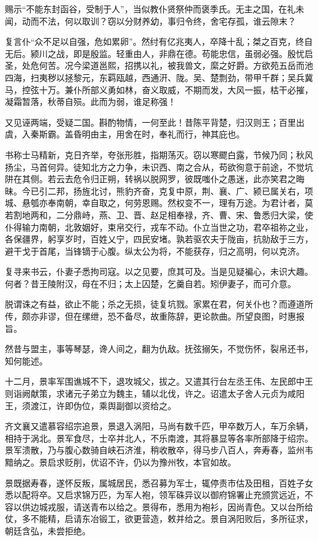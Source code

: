 \documentclass[12pt,UTF8]{ctexbook}
\begin{document}
赐示“不能东封函谷，受制于人”，当似教仆贤祭仲而褒季氏。无主之国，在礼未闻，动而不法，何以取训？窃以分财养幼，事归令终，舍宅存孤，谁云隙末？

复言仆“众不足以自强，危如累卵”。然纣有亿兆夷人，卒降十乱；桀之百克，终自无后。颍川之战，即是殷监。轻重由人，非鼎在德。苟能忠信，虽弱必强。殷忧启圣，处危何苦。况今梁道邕熙，招携以礼，被我兽文，縻之好爵。方欲苑五岳而池四海，扫夷秽以拯黎元，东羁瓯越，西通汧、陇。吴、楚剽劲，带甲千群；吴兵冀马，控弦十万。兼仆所部义勇如林，奋义取威，不期而发，大风一振，枯干必摧，凝霜暂落，秋蒂自殒。此而为弱，谁足称强！

又见诬两端，受疑二国。斟酌物情，一何至此！昔陈平背楚，归汉则王；百里出虞，入秦斯霸。盖昏明由主，用舍在时，奉礼而行，神其庇也。

书称士马精新，克日齐举，夸张形胜，指期荡灭。窃以寒飂白露，节候乃同；秋风扬尘，马首何异。徒知北方之力争，未识西、南之合从，苟欲徇意于前途，不觉坑阱在其侧。若云去危令归正朔，转祸以脱网罗，彼既嗤仆之愚迷，此亦笑君之晦昧。今已引二邦，扬旌北讨，熊豹齐奋，克复中原，荆、襄、广、颍已属关右，项城、悬瓠亦奉南朝，幸自取之，何劳恩赐。然权变不一，理有万途。为君计者，莫若割地两和，二分鼎峙，燕、卫、晋、赵足相奉禄，齐、曹、宋、鲁悉归大梁，使仆得输力南朝，北敦姻好，束帛交行，戎车不动。仆立当世之功，君卒祖祢之业，各保疆界，躬享岁时，百姓乂宁，四民安堵。孰若驱农夫于陇亩，抗勍敌于三方，避干戈于首尾，当锋镝于心腹。纵太公为将，不能获存，归之高明，何以克济。

复寻来书云，仆妻子悉拘司寇。以之见要，庶其可及。当是见疑褊心，未识大趣。何者？昔王陵附汉，母在不归；太上囚楚，乞羹自若。矧伊妻子，而可介意。

脱谓诛之有益，欲止不能；杀之无损，徒复坑戮。家累在君，何关仆也？而遵道所传，颇亦非谬，但在缧绁，恐不备尽，故重陈辞，更论款曲。所望良图，时惠报旨。

然昔与盟主，事等琴瑟，谗人间之，翻为仇敌。抚弦搦矢，不觉伤怀，裂帛还书，知何能述。

十二月，景率军围谯城不下，退攻城父，拔之。又遣其行台左丞王伟、左民郎中王则诣阙献策，求诸元子弟立为魏主，辅以北伐，许之。诏遣太子舍人元贞为咸阳王，须渡江，许即伪位，乘舆副御以资给之。

齐文襄又遣慕容绍宗追景，景退入涡阳，马尚有数千匹，甲卒数万人，车万余辆，相持于涡北。景军食尽，士卒并北人，不乐南渡，其将暴显等各率所部降于绍宗。景军溃散，乃与腹心数骑自峡石济淮，稍收散卒，得马步八百人，奔寿春，监州韦黯纳之。景启求贬削，优诏不许，仍以为豫州牧，本官如故。

景既据寿春，遂怀反叛，属城居民，悉召募为军士，辄停责市估及田租，百姓子女悉以配将卒。又启求锦万匹，为军人袍，领军硃异议以御府锦署止充颁赏远近，不容以供边城戎服，请送青布以给之。景得布，悉用为袍衫，因尚青色。又以台所给仗，多不能精，启请东冶锻工，欲更营造，敕并给之。景自涡阳败后，多所征求，朝廷含弘，未尝拒绝。
\end{document}
